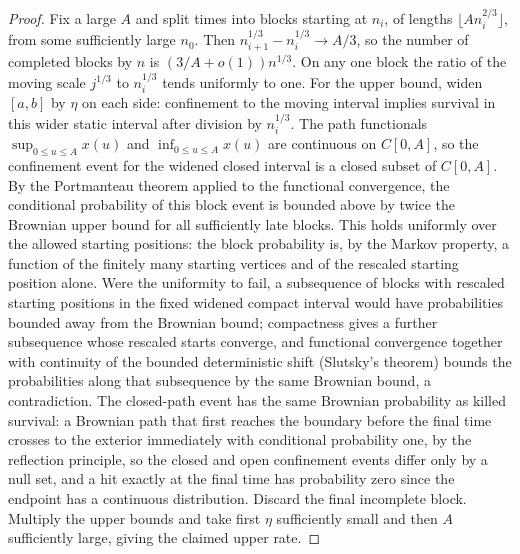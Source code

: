 \documentclass[11pt]{article}
\theoremstyle{definition}
\theoremstyle{remark}
\begin{document}
\begin{proof}
Fix a large $A$ and split times into blocks starting at $n_i$,
of lengths $\lfloor A n_i^{2/3}\rfloor$, from some sufficiently
large $n_0$. Then $n_{i+1}^{1/3}-n_i^{1/3}\to A/3$,
so the number of completed blocks by $n$ is
$(3/A+o(1))n^{1/3}$. On any one block the ratio of the
moving scale $j^{1/3}$ to $n_i^{1/3}$ tends uniformly to one.
For the upper bound, widen $[a,b]$ by $\eta$ on each side:
confinement to the moving interval implies survival in this
wider static interval after division by $n_i^{1/3}$.
The path functionals $\sup_{0\le u\le A}x(u)$ and
$\inf_{0\le u\le A}x(u)$ are continuous on $C[0,A]$, so the
confinement event for the widened closed interval is a closed
subset of $C[0,A]$. By the Portmanteau theorem applied to the
functional convergence, the conditional probability of this
block event is bounded above by twice the Brownian upper bound
for all sufficiently late blocks. This holds uniformly over
the allowed starting positions: the block probability is, by
the Markov property, a function of the finitely many starting
vertices and of the rescaled starting position alone. Were the
uniformity to fail, a subsequence of blocks with rescaled
starting positions in the fixed widened compact interval would
have probabilities bounded away from the Brownian bound;
compactness gives a further subsequence whose rescaled starts
converge, and functional convergence together with continuity
of the bounded deterministic shift (Slutsky's theorem) bounds
the probabilities along that subsequence by the same Brownian
bound, a contradiction. The closed-path event has the same
Brownian probability as
killed survival: a Brownian path that first reaches the
boundary before the final time crosses to the exterior
immediately with conditional probability one, by the
reflection principle, so the closed and open confinement
events differ only by a null set, and a hit
exactly at the final time has probability zero since the
endpoint has a continuous distribution.
Discard the final incomplete block. Multiply the upper bounds
and take first $\eta$ sufficiently small and then $A$
sufficiently large, giving the claimed upper rate.


\end{proof}
\end{document}
